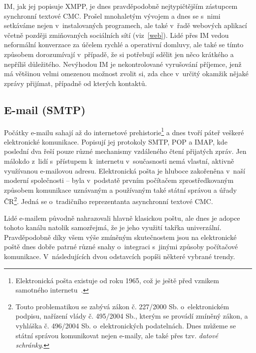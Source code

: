 \documentclass[12pt,oneside,final]{fithesis2}
\begin{document}
IM, jak jej popisuje XMPP, je dnes pravděpodobně nejtypičtějším zástupcem synchronní textové CMC. Prošel mnohaletým vývojem a dnes se s~nimi setkáváme nejen v~instalovaných programech, ale také v~řadě webových aplikací včetně později zmiňovaných sociálních sítí (viz~\ref{web}). Lidé přes IM vedou neformální konverzace za účelem rychlé a operativní domluvy, ale také se tímto způsobem dorozumívají v~případě, že si potřebují sdělit jen něco krátkého a nepříliš důležitého. Nevýhodou IM je nekontrolované vyrušování příjemce, jenž má většinou velmi omezenou možnost zvolit si, zda chce v~určitý okamžik nějaké zprávy přijímat, případně od kterých kontaktů.

\subsection{E-mail (SMTP)}\label{email}
Počátky e-mailu sahají až do internetové prehistorie\footnote{Elektronická pošta existuje od roku 1965, což je ještě před vznikem samotného internetu~\cite{vanvleck2012electronic}.} a dnes tvoří páteř veškeré elektronické komunikace. Popisují jej protokoly SMTP, POP a IMAP, kde poslední dva řeší pouze různé mechanismy vzdáleného čtení přijatých zpráv. Jen málokdo z~lidí s~přístupem k~internetu v~současnosti nemá vlastní, aktivně využívanou e-mailovou adresu. Elektronická pošta je hluboce zakořeněna v~naší moderní společnosti -- byla v~podstatě prvním počítačem zprostředkovaným způsobem komunikace uznávaným a používaným také státní správou a úřady ČR\footnote{Touto problematikou se zabývá zákon č. 227/2000 Sb. o~elektronickém podpisu, nařízení vlády č. 495/2004 Sb., kterým se provádí zmíněný zákon, a vyhláška č. 496/2004 Sb. o~elektronických podatelnách. Dnes můžeme se státní správou komunikovat nejen e-maily, ale také přes tzv. \emph{datové schránky}.}. Jedná se o~tradičního reprezentanta asynchronní textové CMC.

Lidé e-mailem původně nahrazovali hlavně klasickou poštu, ale dnes je adopce tohoto kanálu natolik samozřejmá, že je jeho využití takřka univerzální. Pravděpodobně díky všem výše zmíněným skutečnostem jsou na elektronické poště dnes dobře patrné různé snahy o~integraci s~jinými způsoby počítačové komunikace. V~následujících dvou odstavcích popíši některé vybrané trendy.
\end{document}
